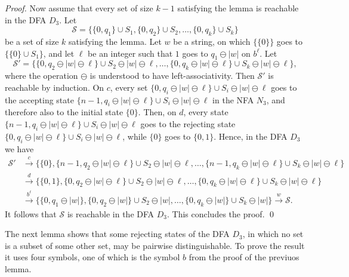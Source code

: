 \documentclass[runningheads]{llncs}
\begin{document}
\begin{proof}
 Now assume that every set of size $k-1$ satisfying the lemma
 is reachable in the DFA $D_3$.
 Let 
 $$
  \mathcal{S}=\Big\{\{0,q_1\}\cup S_1,\{0,q_2\}\cup S_2,\ldots,\{0,q_k\}\cup S_k\Big\} 
 $$
 be a set of size $k$ satisfying the lemma.
 Let $w$ be a string, on which $\big\{ \{0\} \big\}$
 goes to $\big\{ \{0\}\cup S_1 \big\}$,
 and let $\ell$ be an integer such that  $1$ goes to $q_1\ominus|w|$ on $b^\ell$.
 Let
 $$
 \mathcal{S'}=\Big\{\{0,q_2\ominus|w|\ominus\ell\}   \cup 
                        S_2\ominus|w|\ominus\ell,    \ldots,
                    \{0,q_k\ominus|w|\ominus\ell\}    \cup 
                        S_k\ominus|w|\ominus\ell      \Big\},
 $$
 where the operation $\ominus$ is understood to have left-associativity.
 Then $\mathcal{S'}$ is reachable by induction. 
 On $c$,
 every set $\{0,q_i\ominus|w|\ominus\ell\}\cup S_i\ominus|w|\ominus\ell$
 goes  to the accepting state 
 $\{n-1,q_i\ominus|w|\ominus\ell \}\cup S_i\ominus|w|\ominus\ell$
 in the NFA $N_3$, 
 and therefore also to the initial state $\{0\}$.
 Then, on $d$, every state 
  $\{n-1,q_i\ominus|w|\ominus\ell\}\cup S_i\ominus |w|\ominus\ell$
 goes to the rejecting state 
 $\{0,q_i\ominus|w|\ominus\ell \}\cup S_i\ominus|w|\ominus\ell $,
 while $\{0\}$ goes to $\{0,1\}$.
 Hence, in the DFA $D_3$ we have 
 \begin{align*}
   \mathcal{S'}
  &\stackrel{c}{\rightarrow} 
    \Big\{\{0\},
     \{n-1,q_2\ominus|w|\ominus\ell\}\cup S_2\ominus|w|\ominus\ell,  \ldots,
     \{n-1,q_k\ominus|w|\ominus\ell\}\cup S_k\ominus|w|\ominus\ell\Big\} \\
  & \stackrel{d}{\rightarrow}
    \Big\{\{0,1\}, \{0,q_2\ominus|w|\ominus\ell\}\cup S_2\ominus|w|\ominus\ell,
     \ldots, \{0,q_k\ominus|w|\ominus\ell\}\cup S_k\ominus|w|\ominus\ell\Big\} \\
  & \stackrel{b^\ell}{\rightarrow}
   \Big\{\{0,q_1\ominus |w|\}, \{0,q_2\ominus |w|\}\cup S_2\ominus |w|,\ldots,
                                \{0,q_k\ominus |w|\}\cup S_k\ominus |w|\Big\}
     \stackrel{w}{\rightarrow}\mathcal{S}.
 \end{align*}
 It follows that $\mathcal{S}$ is reachable in the DFA $D_3$.
 This  concludes the proof.
\qed
\end{proof}

The next lemma 
shows that some  rejecting states of the DFA $D_3$, 
in which no set is a subset of some other set,
may be pairwise distinguishable.
To prove the result
it uses four symbols,
one of which is the symbol $b$ from the proof of the previuos lemma.
\end{document}
